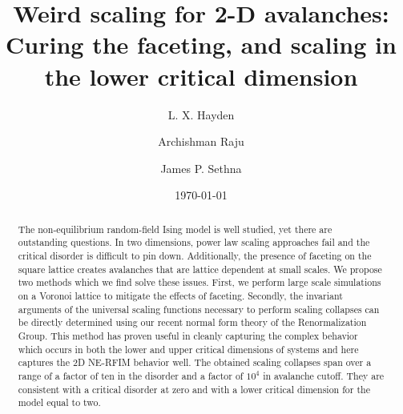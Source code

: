 \documentclass[reprint,amsmath,amssymb,aps,floatfix, prl]{revtex4-1}
\begin{document}
%
\title{Weird scaling for 2-D avalanches: \\Curing the faceting, and scaling in the lower critical dimension}
%
\author{L. X. Hayden}
 \author {Archishman Raju}
 \author{James P. Sethna}
%
\date{\today}
%
\begin{abstract}
The non-equilibrium random-field Ising model is well studied, yet there are outstanding questions. In two dimensions, power law scaling approaches fail and the critical disorder is difficult to pin down. Additionally, the presence of faceting on the square lattice creates avalanches that are lattice dependent at small scales. We propose two methods which we find solve these issues. First, we perform large scale simulations on a Voronoi lattice to mitigate the effects of faceting. Secondly, the invariant arguments of the universal scaling functions necessary to perform scaling collapses can be directly determined using our recent normal form theory of the Renormalization Group. This method has proven useful in cleanly capturing the complex behavior which occurs in both the lower and upper critical dimensions of systems and here captures the 2D NE-RFIM behavior well. The obtained scaling collapses span over a range of a factor of ten in the disorder and a factor of $10^4$ in avalanche cutoff. They are consistent with a critical disorder at zero and with a lower critical dimension for the model equal to two. 
\end{abstract}
%
\maketitle
\end{document}
